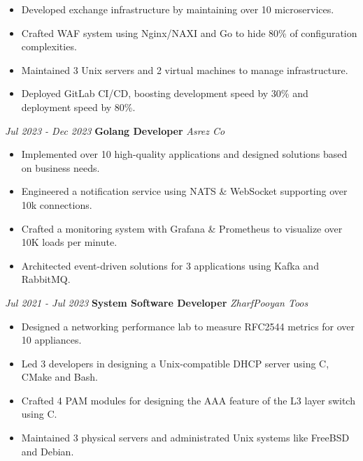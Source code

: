 \documentclass{engineercv}
\begin{document}
\begin{itemize}
  \item Developed exchange infrastructure by maintaining over 10 microservices.
  \item Crafted WAF system using Nginx/NAXI and Go to hide 80\% of configuration complexities.
  \item Maintained 3 Unix servers and 2 virtual machines to manage infrastructure.
  \item Deployed GitLab CI/CD, boosting development speed by 30\% and deployment speed by 80\%.
\end{itemize}

\begin{twocolentry}{\textit{Jul 2023 - Dec 2023}}
  \textbf{Golang Developer}
  \textit{Asrez Co}
\end{twocolentry}

\begin{itemize}
  \item Implemented over 10 high-quality applications and designed solutions based on business needs.
  \item Engineered a notification service using NATS \& WebSocket supporting over 10k connections.
  \item Crafted a monitoring system with Grafana \& Prometheus to visualize over 10K loads per minute.
  \item Architected event-driven solutions for 3 applications using Kafka and RabbitMQ.
\end{itemize}

\begin{twocolentry}{\textit{Jul 2021 - Jul 2023}}
  \textbf{System Software Developer}
  \textit{ZharfPooyan Toos}
\end{twocolentry}

\begin{itemize}
  \item Designed a networking performance lab to measure RFC2544 metrics for over 10 appliances.
  \item Led 3 developers in designing a Unix-compatible DHCP server using C, CMake and Bash.
  \item Crafted 4 PAM modules for designing the AAA feature of the L3 layer switch using C.
  \item Maintained 3 physical servers and administrated Unix systems like FreeBSD and Debian.
\end{itemize}
\end{document}
